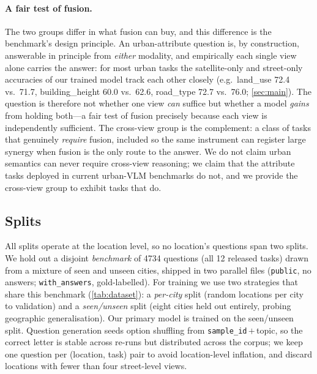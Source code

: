 \paragraph{A fair test of fusion.}
The two groups differ in what fusion can buy, and this difference is the benchmark's
design principle. An urban-attribute question is, by construction, answerable in
principle from \emph{either} modality, and empirically each single view alone
carries the answer: for most urban tasks the satellite-only and street-only
accuracies of our trained model track each other closely (e.g.\ \textsf{land\_use}
\num{72.4} vs.\ \num{71.7}, \textsf{building\_height} \num{60.0} vs.\ \num{62.6},
\textsf{road\_type} \num{72.7} vs.\ \num{76.0}; \cref{sec:main}). The question is
therefore not whether one view \emph{can} suffice but whether a model \emph{gains}
from holding both---a fair test of fusion precisely because each view is
independently sufficient. The cross-view group is the complement: a class of tasks
that genuinely \emph{require} fusion, included so the same instrument can register
large synergy when fusion is the only route to the answer. We do not claim urban
semantics can never require cross-view reasoning; we claim that the attribute tasks
deployed in current urban-VLM benchmarks do not, and we provide the cross-view
group to exhibit tasks that do.

\subsection{Splits}
\label{sec:splits}
All splits operate at the location level, so no location's questions span two
splits. We hold out a disjoint \emph{benchmark} of \num{4734} questions (all
\num{12} released tasks) drawn from a mixture of seen and unseen cities, shipped in
two parallel files (\texttt{public}, no answers; \texttt{with\_answers},
gold-labelled). For training we use two strategies that share this benchmark
(\cref{tab:dataset}): a \emph{per-city} split (random locations per city to
validation) and a \emph{seen/unseen} split (eight cities held out entirely, probing
geographic generalisation). Our primary model is trained on the seen/unseen split.
Question generation seeds option shuffling from \texttt{sample\_id}\,$+$\,topic, so
the correct letter is stable across re-runs but distributed across the corpus; we
keep one question per (location, task) pair to avoid location-level inflation, and
discard locations with fewer than four street-level views.

